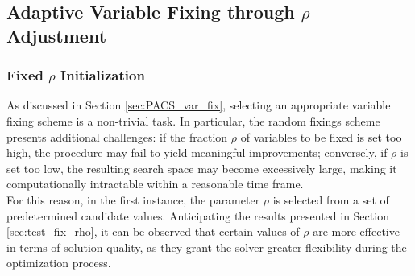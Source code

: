 \subsection{Adaptive Variable Fixing through $\rho$ Adjustment}\label{sec:dyn_var_fix}
\subsubsection{Fixed $\rho$ Initialization}
As discussed in Section \ref{sec:PACS_var_fix}, selecting an appropriate variable fixing scheme is a non-trivial task. In particular, the random fixings scheme presents additional challenges: if the fraction $\rho$ of variables to be fixed is set too high, the procedure may fail to yield meaningful improvements; conversely, if $\rho$ is set too low, the resulting search space may become excessively large, making it computationally intractable within a reasonable time frame. \\
For this reason, in the first instance, the parameter $\rho$ is selected from a set of predetermined candidate values. Anticipating the results presented in Section \ref{sec:test_fix_rho}, it can be observed that certain values of $\rho$ are more effective in terms of solution quality, as they grant the solver greater flexibility during the optimization process.
